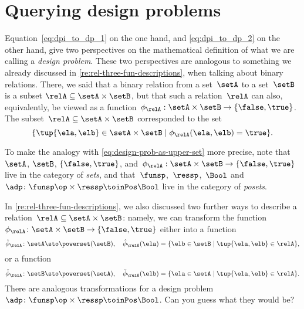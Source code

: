 

\section{Querying design problems}
\label{sec:dp-querying}



Equation~\cref{eq:dpi_to_dp_1} on the one hand, and \cref{eq:dpi_to_dp_2} on the other hand, give two perspectives on the mathematical definition of what we are calling a \emph{design problem}.
These two perspectives are analogous to something we already discussed in \cref{re:rel-three-fun-descriptions}, when talking about binary relations.
There, we said that a binary relation from a set~$\setA$ to a set~$\setB$ is a subset $\relA \subseteq \setA \times \setB$,
but that such a relation~$\relA$ can also, equivalently, be viewed as a function~$\phi_{\relA}: \setA \times \setB \to \{ \false, \true \}$.
The subset~$\relA \subseteq \setA \times \setB$ corresponded to the set
\begin{equation}
    \{ \tup{\ela, \elb} \in \setA \times \setB \mid \phi_{\relA}(\ela, \elb) = \true \}.
\end{equation}

To make the analogy with \cref{eq:design-prob-as-upper-set} more precise, note that~$\setA$, $\setB$, $\{ \false, \true \}$,
and~$\phi_{\relA}: \setA \times \setB \to \{ \false, \true \}$ live in the category of \emph{sets},
and that~$\funsp$,~$\ressp$,~$\Bool$ and~$\adp\colon \funsp\op \times \ressp\toinPos \Bool$ live in the category of \emph{posets}.

In \cref{re:rel-three-fun-descriptions}, we also discussed two further ways to describe a relation~$\relA \subseteq \setA \times \setB$:
namely, we can transform the function~$\phi_{\relA}\colon \setA \times \setB \to \{ \false, \true \}$ either into a function
\begin{equation}
    \label{eq:curried-relation-again}
    \hat \phi_{\relA} \colon \setA \sto \powerset (\setB), \quad \hat \phi_{\relA} (\ela) = \{ \elb \in \setB \mid \tup{\ela, \elb} \in \relA \},
\end{equation}
or a function
\begin{equation}
    \label{eq:co-curried-relation-again}
    \check \phi_{\relA} \colon \setB \sto \powerset (\setA), \quad \check \phi_{\relA} (\elb) = \{ \ela \in \setA \mid \tup{\ela, \elb} \in \relA \}.
\end{equation}
There are analogous transformations for a design problem~$\adp\colon \funsp\op \times \ressp\toinPos \Bool$. Can you guess what they would be?

